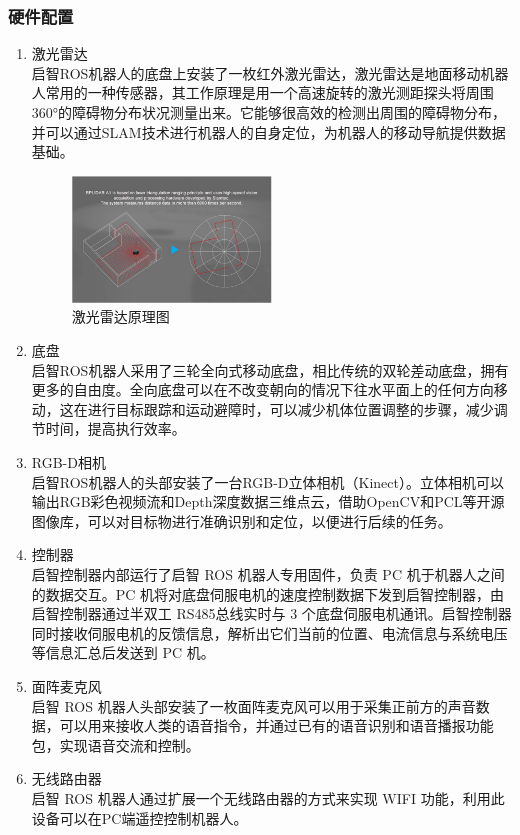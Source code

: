 \documentclass[11pt]{article}
\begin{document}
\subsubsection{硬件配置}
\begin{enumerate}[$\bullet$]
    \item 激光雷达\\
    启智ROS机器人的底盘上安装了一枚红外激光雷达，激光雷达是地面移动机器人常用的一种传感器，其工作原理是用一个高速旋转的激光测距探头将周围
360°的障碍物分布状况测量出来。它能够很高效的检测出周围的障碍物分布，并可以通过SLAM技术进行机器人的自身定位，为机器人的移动导航提供数据基础。
\begin{figure}[H] %
    \centering %
    \includegraphics[width=0.5\textwidth]{7} %
    \caption{激光雷达原理图}
\end{figure}
    \item 底盘\\
    启智ROS机器人采用了三轮全向式移动底盘，相比传统的双轮差动底盘，拥有更多的自由度。全向底盘可以在不改变朝向的情况下往水平面上的任何方向移动，这在进行目标跟踪和运动避障时，可以减少机体位置调整的步骤，减少调节时间，提高执行效率。
    \item RGB-D相机\\
    启智ROS机器人的头部安装了一台RGB-D立体相机（Kinect）。立体相机可以输出RGB彩色视频流和Depth深度数据三维点云，借助OpenCV和PCL等开源图像库，可以对目标物进行准确识别和定位，以便进行后续的任务。
    \item 控制器\\
    启智控制器内部运行了启智 ROS 机器人专用固件，负责 PC
机于机器人之间的数据交互。PC
机将对底盘伺服电机的速度控制数据下发到启智控制器，由启智控制器通过半双工
RS485总线实时与 3
个底盘伺服电机通讯。启智控制器同时接收伺服电机的反馈信息，解析出它们当前的位置、电流信息与系统电压等信息汇总后发送到
PC 机。 
    \item 面阵麦克风\\
    启智 ROS
机器人头部安装了一枚面阵麦克风可以用于采集正前方的声音数据，可以用来接收人类的语音指令，并通过已有的语音识别和语音播报功能包，实现语音交流和控制。
    \item 无线路由器\\
    启智 ROS 机器人通过扩展一个无线路由器的方式来实现 WIFI
功能，利用此设备可以在PC端遥控控制机器人。
\end{enumerate}
\end{document}
